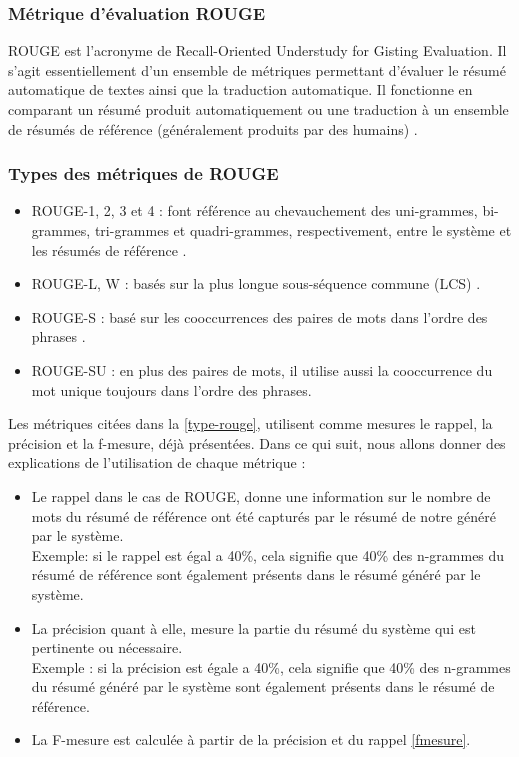         \subsubsection{Métrique d'évaluation ROUGE\label{metrique-eval}}
        ROUGE est l'acronyme de \textquotedbl Recall-Oriented Understudy for Gisting Evaluation\textquotedbl. Il s'agit essentiellement d'un ensemble de métriques permettant d'évaluer le résumé automatique de textes ainsi que la traduction automatique. Il fonctionne en comparant un résumé produit automatiquement ou une traduction à un ensemble de résumés de référence (généralement produits par des humains) \cite{rouge0}.

        \subsubsection{Types des métriques de ROUGE\label{type-rouge}}
        \begin{itemize}
            \item{ROUGE-1, 2, 3 et 4 : font référence au chevauchement des uni-grammes, bi-grammes, tri-grammes et quadri-grammes, respectivement, entre le système et les résumés de référence \cite{rouge1}.}\\
            \item{ROUGE-L, W : basés sur la plus longue sous-séquence commune (LCS) \cite{rouge2}.}\\
            \item{ROUGE-S : basé sur les cooccurrences des paires de mots dans l'ordre des phrases \cite{rouge2}.}\\
            \item{ROUGE-SU : en plus des paires de mots, il utilise aussi la cooccurrence du mot unique toujours dans l'ordre des phrases.}
        \end{itemize}

        Les métriques citées dans la \autoref{type-rouge}, utilisent comme mesures le rappel, la précision et la f-mesure, déjà présentées. Dans ce qui suit, nous allons donner des explications de l'utilisation de chaque métrique :  
        \begin{itemize}
            \item {Le rappel dans le cas de ROUGE, donne une information sur le nombre de mots du résumé de référence ont été capturés par le résumé de notre généré par le système.\\ 
                Exemple: si le rappel est égal a 40\%, cela signifie que 40\% des n-grammes du résumé de référence sont également présents dans le résumé généré par le système.}\\
            \item {La précision quant à elle, mesure la partie du résumé du système qui est pertinente ou nécessaire.\\ 
                Exemple : si la précision est égale a 40\%, cela signifie que 40\% des n-grammes du résumé généré par le système sont également présents dans le résumé de référence.}
            \item {La F-mesure est calculée à partir de la précision et du rappel \ref{fmesure}.}
        \end{itemize}

